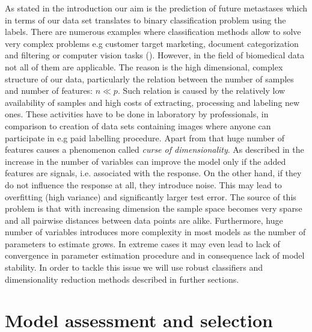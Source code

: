 \documentclass[shortabstract, english, mgr]{iithesis}
\begin{document}
As stated in the introduction our aim is the prediction of future metastases which in terms of our data set translates to binary classification problem using the labels. There are numerous examples where classification methods allow to solve very complex problems e.g customer target marketing, document categorization and filtering or computer vision tasks (\cite{dataClassification}). However, in the field of biomedical data not all of them are applicable. The reason is the high dimensional, complex structure of our data, particularly the relation between the number of samples and number of features: $n \ll p$. Such relation is caused by the relatively low availability of samples and high costs of extracting, processing and labeling new ones. These activities have to be done in laboratory by professionals, in comparison to creation of data sets containing images where anyone can participate in e.g paid labelling procedure. Apart from that huge number of features causes a phenomenon called \textit{curse of dimensionality}. As described in \cite[chapter 6.4.3]{ISL} the increase in the number of variables can improve the model only if the added features are signals, i.e. associated with the response. On the other hand, if they do not influence the response at all, they introduce noise. This may lead to overfitting (high variance) and significantly larger test error. The source of this problem is that with increasing dimension the sample space becomes very sparse and all pairwise distances between data points are alike. Furthermore, huge number of variables introduces more complexity in most models as the number of parameters to estimate grows. In extreme cases it may even lead to lack of convergence in parameter estimation procedure and in consequence lack of model stability. In order to tackle this issue we will use robust classifiers and dimensionality reduction methods described in further sections.

\section{Model assessment and selection} \label{section:selection}
\end{document}
